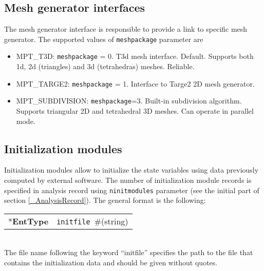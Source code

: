 \documentclass[a4paper]{article}
\newcommand{\param}[1]{\texttt{#1}} %
\newcommand{\field}[2]{\param{#1}~\#{\tiny(#2)}} %
\newcommand{\entKeyword}[1]{*\textbf{#1}} %
\newenvironment{record}[1][]{\begin{tabular}{|ll}}{\end{tabular}\\}
\newcommand{\recentry}[2]{{#1}&{#2}\\}
\newcounter{rcc}
\newenvironment{record}[1][\textwidth]{\setcounter{rcc}{0}\rowcolors{1}{lightgray}{lightgray}\tabularx{#1}{llR} \hline}
               {\endtabularx}
\newcommand{\recentry}[2]{\ifthenelse{\value{rcc}>0}{$\backslash$ \\}{\setcounter{rcc}{1}}{#1}&{#2}&}
\begin{document}
\subsection{Mesh generator interfaces}
\label{meshpackages}
The mesh generator interface is responsible to provide a link to
specific mesh generator. The supported values of \param{meshpackage}
parameter are
\begin{itemize}
\item
MPT\_T3D:  \param{meshpackage} = 0. T3d mesh interface. Default. Supports both 1d, 2d
(triangles) and 3d (tetrahedras) meshes. Reliable.
\item
MPT\_TARGE2:	\param{meshpackage} = 1. Interface to Targe2 2D
mesh generator.
\item
MPT\_SUBDIVISION: \param{meshpackage}=3. Built-in subdivision algorithm. Supports triangular 2D and tetrahedral 3D meshes. Can operate in parallel mode.
\end{itemize}
%
\subsection{Initialization modules}
\label{InitModulesSec}
Initialization modules allow to initialize the state variables using data 
previously computed by external software. The number of initialization module records is specified in
analysis record using \param{ninitmodules} parameter (see the initial part of section \ref{_AnalysisRecord}). The general format
is the following:\\
\begin{record}
  \recentry{\entKeyword{EntType}}{\field{initfile}{string}}
\end{record}
The file name following the keyword ``initfile'' specifies
the path to the file that contains the initialization data
and should be given without quotes.
\end{document}
